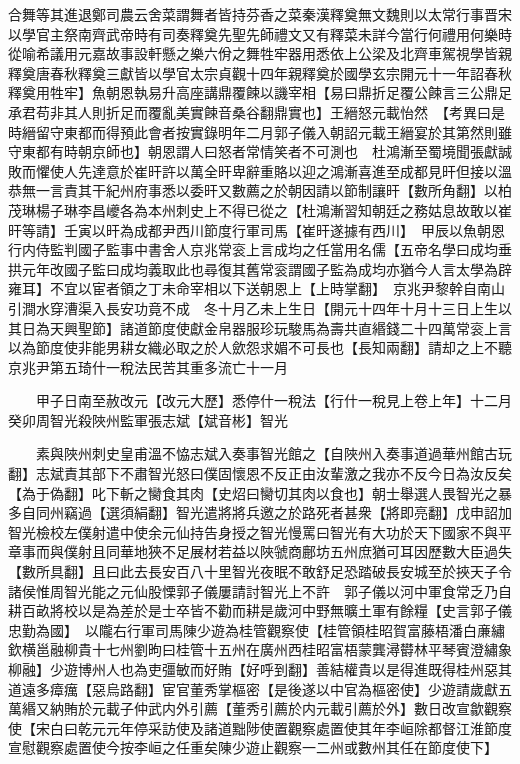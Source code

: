 合舞等其進退鄭司農云舍菜謂舞者皆持芬香之菜秦漢釋奠無文魏則以太常行事晋宋以學官主祭南齊武帝時有司奏釋奠先聖先師禮文又有釋菜未詳今當行何禮用何樂時從喻希議用元嘉故事設軒懸之樂六佾之舞牲牢器用悉依上公梁及北齊車駕視學皆親釋奠唐春秋釋奠三獻皆以學官太宗貞觀十四年親釋奠於國學玄宗開元十一年詔春秋釋奠用牲牢】魚朝恩執易升高座講鼎覆餗以譏宰相【易曰鼎折足覆公餗言三公鼎足承君苟非其人則折足而覆亂美實餗音桑谷翻鼎實也】王縉怒元載怡然　【考異曰是時縉留守東都而得預此會者按實錄明年二月郭子儀入朝詔元載王縉宴於其第然則雖守東都有時朝京師也】朝恩謂人曰怒者常情笑者不可測也　杜鴻漸至蜀境聞張獻誠敗而懼使人先達意於崔旰許以萬全旰卑辭重賂以迎之鴻漸喜進至成都見旰但接以溫恭無一言責其干紀州府事悉以委旰又數薦之於朝因請以節制讓旰【數所角翻】以柏茂琳楊子琳李昌巙各為本州刺史上不得已從之【杜鴻漸習知朝廷之務姑息故敢以崔旰等請】壬寅以旰為成都尹西川節度行軍司馬【崔旰遂據有西川】　甲辰以魚朝恩行内侍監判國子監事中書舍人京兆常衮上言成均之任當用名儒【五帝名學曰成均垂拱元年改國子監曰成均義取此也尋復其舊常衮謂國子監為成均亦猶今人言太學為辟雍耳】不宜以宦者領之丁未命宰相以下送朝恩上【上時掌翻】　京兆尹黎幹自南山引澗水穿漕渠入長安功竟不成　冬十月乙未上生日【開元十四年十月十三日上生以其日為天興聖節】諸道節度使獻金帛器服珍玩駿馬為壽共直緡錢二十四萬常衮上言以為節度使非能男耕女織必取之於人歛怨求媚不可長也【長知兩翻】請却之上不聽京兆尹第五琦什一稅法民苦其重多流亡十一月

　　甲子日南至赦改元【改元大歷】悉停什一稅法【行什一稅見上卷上年】十二月癸卯周智光殺陜州監軍張志斌【斌音彬】智光

　　素與陜州刺史皇甫溫不恊志斌入奏事智光館之【自陜州入奏事道過華州館古玩翻】志斌責其部下不肅智光怒曰僕固懷恩不反正由汝輩激之我亦不反今日為汝反矣【為于偽翻】叱下斬之臠食其肉【史炤曰臠切其肉以食也】朝士舉選人畏智光之暴多自同州竊過【選須絹翻】智光遣將將兵邀之於路死者甚衆【將即亮翻】戊申詔加智光檢校左僕射遣中使余元仙持告身授之智光慢罵曰智光有大功於天下國家不與平章事而與僕射且同華地狹不足展材若益以陜虢商鄜坊五州庶猶可耳因歷數大臣過失【數所具翻】且曰此去長安百八十里智光夜眠不敢舒足恐踏破長安城至於挾天子令諸侯惟周智光能之元仙股慄郭子儀屢請討智光上不許　郭子儀以河中軍食常乏乃自耕百畝將校以是為差於是士卒皆不勸而耕是歲河中野無曠土軍有餘糧【史言郭子儀忠勤為國】　以隴右行軍司馬陳少遊為桂管觀察使【桂管領桂昭賀富藤梧潘白亷繡欽横邕融柳貴十七州劉昫曰桂管十五州在廣州西桂昭富梧蒙龔潯欎林平琴賓澄繡象柳融】少遊博州人也為吏彊敏而好賄【好呼到翻】善結權貴以是得進既得桂州惡其道遠多瘴癘【惡烏路翻】宦官董秀掌樞密【是後遂以中官為樞密使】少遊請歲獻五萬緡又納賄於元載子仲武内外引薦【董秀引薦於内元載引薦於外】數日改宣歙觀察使【宋白曰乾元元年停采訪使及諸道黜陟使置觀察處置使其年李峘除都督江淮節度宣慰觀察處置使今按李峘之任重矣陳少遊止觀察一二州或數州其任在節度使下】

